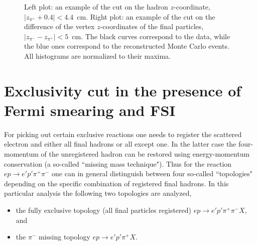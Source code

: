\begin{figure}[!ht]
\begin{center}
\end{center}
\caption{\small Left plot: an example of the cut on the hadron $z$-coordinate, $|z_{\pi^{+}} + 0.4| < 4.4$~cm. Right plot: an example of the cut on the difference of the vertex $z$-coordinates of the final particles, $|z_{\pi^{-}} - z_{\pi^{+}}| < 5$~cm. The black curves correspond to the data, while the blue ones correspond to the reconstructed Monte Carlo events. All histograms are normalized to their maxima.}
\label{fig:add_cuts_vert}
\end{figure}



\newpage
\section{Exclusivity cut in the presence of Fermi smearing and FSI}
\label{Sect:excl_cut}

For picking out certain exclusive reactions one needs to register the scattered electron and either all final hadrons or all except one. In the latter case the four-momentum of the unregistered hadron can be restored using energy-momentum conservation (a so-called ``missing mass technique"). Thus for the reaction $e p \rightarrow e' p' \pi^{+} \pi^{-} $ one can in general distinguish between four so-called ``topologies" depending on the specific combination of registered final hadrons. In this particular analysis the following two topologies are analyzed,%
\begin{itemize}
\item the fully exclusive topology (all final particles registered) $e p \rightarrow e' p' \pi^{+} \pi^{-} X$, and%
\item the $\pi^{-}$ missing topology $e p \rightarrow e' p' \pi^{+} X$.
\end{itemize} %



